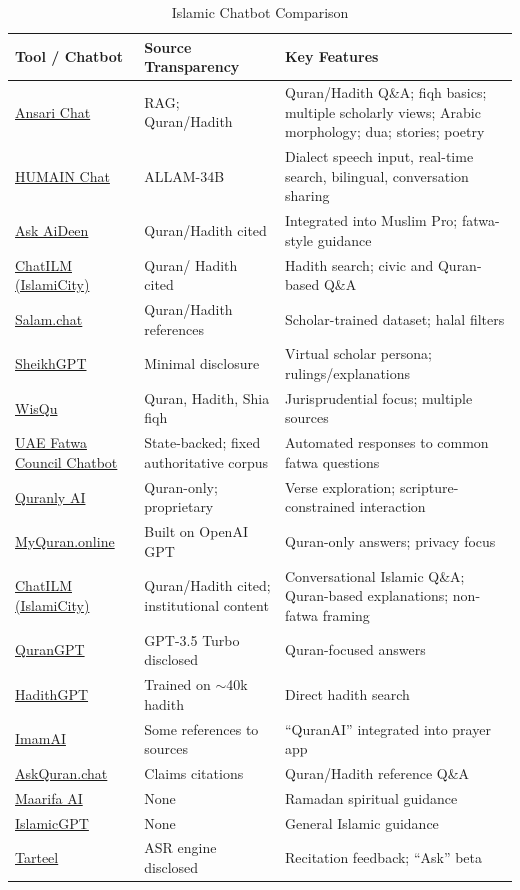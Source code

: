 \documentclass{article}
\begin{document}
\begin{table}[t]
\caption{Islamic Chatbot Comparison}
\label{tab:islamic_chatbots}
\centering
\begin{tabularx}{\textwidth}{l X X}
\toprule
\textbf{Tool / Chatbot} & \textbf{Source Transparency} & \textbf{Key Features} \\
\midrule
\href{https://ansari.chat}{Ansari Chat} & RAG; Quran/Hadith & Quran/Hadith Q\&A; fiqh basics; multiple scholarly views; Arabic morphology; dua; stories; poetry \\
\href{https://www.humain.ai}{HUMAIN Chat} & ALLAM-34B & Dialect speech input, real-time search, bilingual, conversation sharing \\
\href{https://www.muslimpro.com}{Ask AiDeen} & Quran/Hadith cited & Integrated into Muslim Pro; fatwa-style guidance \\
\href{https://www.islamicity.org}{ChatILM (IslamiCity)} & Quran/ Hadith cited & Hadith search; civic and Quran-based Q\&A \\
\href{https://salam.chat}{Salam.chat} & Quran/Hadith references & Scholar-trained dataset; halal filters \\
\href{https://sheikhgpt.org}{SheikhGPT} & Minimal disclosure & Virtual scholar persona; rulings/explanations \\
\href{https://wisqu.ai}{WisQu} & Quran, Hadith, Shia fiqh & Jurisprudential focus; multiple sources \\
\href{https://fatwauae.gov.ae}{UAE Fatwa Council Chatbot} & 
State-backed; fixed authoritative corpus &  Automated responses to common fatwa questions\\
\href{https://quranly.app}{Quranly AI} & 
Quran-only; proprietary &  Verse exploration; scripture-constrained interaction \\
\href{https://myquran.online}{MyQuran.online} & Built on OpenAI GPT & Quran-only answers; privacy focus \\
\href{https://chatilm.islamicity.org/}{ChatILM (IslamiCity)} & 
Quran/Hadith cited; institutional content & 
Conversational Islamic Q\&A; Quran-based explanations; non-fatwa framing \\
\href{https://www.qurangpt.com}{QuranGPT} & GPT-3.5 Turbo disclosed & Quran-focused answers \\
\href{https://hadithgpt.com}{HadithGPT} & Trained on $\sim$40k hadith & Direct hadith search \\
\href{https://www.imamai.app}{ImamAI} & Some references to sources & ``QuranAI'' integrated into prayer app \\
\href{https://askquran.chat}{AskQuran.chat} & Claims citations & Quran/Hadith reference Q\&A \\
\href{https://maarifa.ai}{Maarifa AI} & None & Ramadan spiritual guidance \\
\href{https://islamicgpt.com}{IslamicGPT} & None & General Islamic guidance \\
\href{https://tarteel.ai}{Tarteel} & ASR engine disclosed & Recitation feedback; ``Ask'' beta \\

\bottomrule
\end{tabularx}
\end{table}
\end{document}
